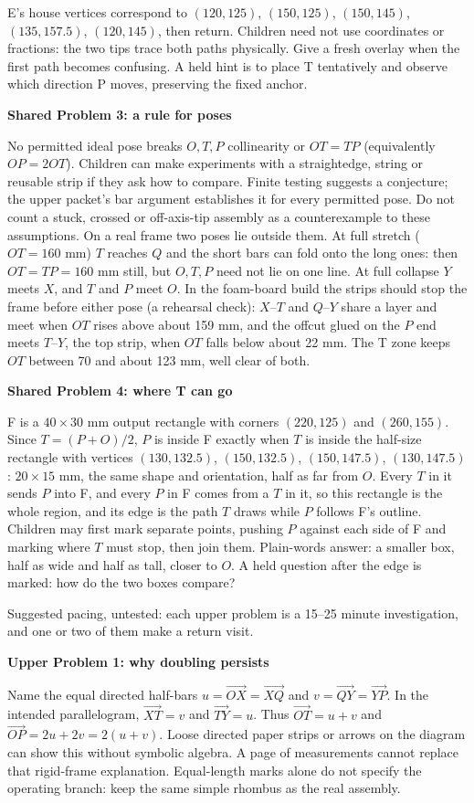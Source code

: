 \documentclass[11pt,letterpaper]{article}
\newcommand{\heading}[1]{\par\vspace{4pt}{\large\bfseries #1}\par}
\newcommand{\sub}[1]{\par\textbf{#1}\par}
\begin{document}
E's house vertices correspond to $(120,125)$, $(150,125)$, $(150,145)$, $(135,157.5)$, $(120,145)$, then return. Children need not use coordinates or fractions: the two tips trace both paths physically. Give a fresh overlay when the first path becomes confusing. A held hint is to place T tentatively and observe which direction P moves, preserving the fixed anchor.

\sub{Shared Problem 3: a rule for poses}
No permitted ideal pose breaks $O,T,P$ collinearity or $OT=TP$ (equivalently $OP=2OT$). Children can make experiments with a straightedge, string or reusable strip if they ask how to compare. Finite testing suggests a conjecture; the upper packet's bar argument establishes it for every permitted pose. Do not count a stuck, crossed or off-axis-tip assembly as a counterexample to these assumptions. On a real frame two poses lie outside them. At full stretch ($OT=160$ mm) $T$ reaches $Q$ and the short bars can fold onto the long ones: then $OT=TP=160$ mm still, but $O,T,P$ need not lie on one line. At full collapse $Y$ meets $X$, and $T$ and $P$ meet $O$. In the foam-board build the strips should stop the frame before either pose (a rehearsal check): $X$--$T$ and $Q$--$Y$ share a layer and meet when $OT$ rises above about 159 mm, and the offcut glued on the $P$ end meets $T$--$Y$, the top strip, when $OT$ falls below about 22 mm. The T zone keeps $OT$ between 70 and about 123 mm, well clear of both.

\sub{Shared Problem 4: where T can go}
F is a $40\times30$ mm output rectangle with corners $(220,125)$ and $(260,155)$. Since $T=(P+O)/2$, $P$ is inside F exactly when $T$ is inside the half-size rectangle with vertices $(130,132.5)$, $(150,132.5)$, $(150,147.5)$, $(130,147.5)$: $20\times15$ mm, the same shape and orientation, half as far from $O$. Every $T$ in it sends $P$ into F, and every $P$ in F comes from a $T$ in it, so this rectangle is the whole region, and its edge is the path $T$ draws while $P$ follows F's outline. Children may first mark separate points, pushing $P$ against each side of F and marking where $T$ must stop, then join them. Plain-words answer: a smaller box, half as wide and half as tall, closer to $O$. A held question after the edge is marked: how do the two boxes compare?
\newpage
\heading{Upper packet: explanation and return visits}
Suggested pacing, untested: each upper problem is a 15--25 minute investigation, and one or two of them make a return visit.
\sub{Upper Problem 1: why doubling persists}
Name the equal directed half-bars $u=\overrightarrow{OX}=\overrightarrow{XQ}$ and $v=\overrightarrow{QY}=\overrightarrow{YP}$. In the intended parallelogram, $\overrightarrow{XT}=v$ and $\overrightarrow{TY}=u$. Thus $\overrightarrow{OT}=u+v$ and $\overrightarrow{OP}=2u+2v=2(u+v)$. Loose directed paper strips or arrows on the diagram can show this without symbolic algebra. A page of measurements cannot replace that rigid-frame explanation. Equal-length marks alone do not specify the operating branch: keep the same simple rhombus as the real assembly.
\end{document}
